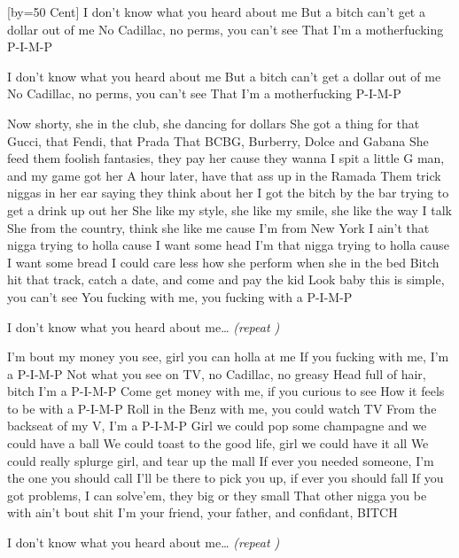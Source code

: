 [by={50 Cent}]
\beginchorus
I don't know what you heard about me 
But a bitch can't get a dollar out of me 
No Cadillac, no perms, you can't see 
That I'm a motherfucking P-I-M-P 
\endchorus

\beginchorus
I don't know what you heard about me 
But a bitch can't get a dollar out of me 
No Cadillac, no perms, you can't see 
That I'm a motherfucking P-I-M-P 
\endchorus

\beginverse
Now shorty, she in the club, she dancing for dollars 
She got a thing for that Gucci, that Fendi, that Prada 
That BCBG, Burberry, Dolce and Gabana 
She feed them foolish fantasies, they pay her cause they wanna 
I spit a little G man, and my game got her 
A hour later, have that ass up in the Ramada 
Them trick niggas in her ear saying they think about her 
I got the bitch by the bar trying to get a drink up out her 
She like my style, she like my smile, she like the way I talk 
She from the country, think she like me cause I'm from New York 
I ain't that nigga trying to holla cause I want some head 
I'm that nigga trying to holla cause I want some bread 
I could care less how she perform when she in the bed 
Bitch hit that track, catch a date, and come and pay the kid 
Look baby this is simple, you can't see 
You fucking with me, you fucking with a P-I-M-P 
\endverse

\beginchorus
I don't know what you heard about me\dots 
\textit{(repeat )}
\endchorus

\beginverse 
I'm bout my money you see, girl you can holla at me 
If you fucking with me, I'm a P-I-M-P 
Not what you see on TV, no Cadillac, no greasy 
Head full of hair, bitch I'm a P-I-M-P 
Come get money with me, if you curious to see 
How it feels to be with a P-I-M-P 
Roll in the Benz with me, you could watch TV 
From the backseat of my V, I'm a P-I-M-P 
Girl we could pop some champagne and we could have a ball 
We could toast to the good life, girl we could have it all 
We could really splurge girl, and tear up the mall 
If ever you needed someone, I'm the one you should call 
I'll be there to pick you up, if ever you should fall 
If you got problems, I can solve'em, they big or they small 
That other nigga you be with ain't bout shit 
I'm your friend, your father, and confidant, BITCH 
\endverse

\beginchorus
I don't know what you heard about me\dots
\textit{(repeat )}
\endchorus

